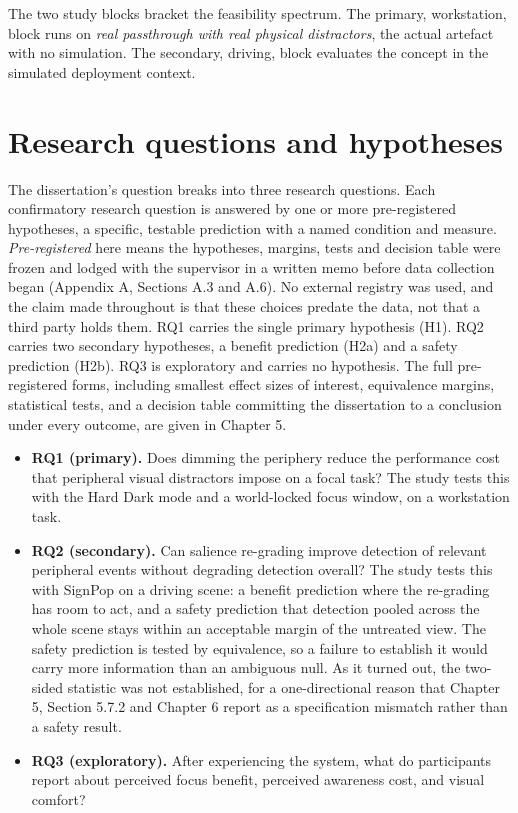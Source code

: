 The two study blocks bracket the feasibility spectrum. The primary, workstation, block runs on
\textit{real passthrough with real physical distractors}, the actual artefact with no simulation. The
secondary, driving, block evaluates the concept in the simulated deployment context.

\section{Research questions and hypotheses}

The dissertation's question breaks into three research questions. Each confirmatory research
question is answered by one or more pre-registered hypotheses, a specific, testable prediction with
a named condition and measure. \textit{Pre-registered} here means the hypotheses, margins, tests and
decision table were frozen and lodged with the supervisor in a written memo before data collection
began (Appendix A, Sections A.3 and A.6). No external registry was used, and the claim made throughout is that
these choices predate the data, not that a third party holds them. RQ1 carries the single primary
hypothesis (H1). RQ2 carries two
secondary hypotheses, a benefit prediction (H2a) and a safety prediction (H2b). RQ3 is exploratory
and carries no hypothesis. The full pre-registered forms, including smallest effect sizes of
interest, equivalence margins, statistical tests, and a decision table committing the dissertation
to a conclusion under every outcome, are given in Chapter 5.

\begin{itemize}
\item \textbf{RQ1 (primary).} Does dimming the periphery reduce the performance cost that peripheral
  visual distractors impose on a focal task? The study tests this with the Hard Dark mode and a
  world-locked focus window, on a workstation task.
\item \textbf{RQ2 (secondary).} Can salience re-grading improve detection of relevant peripheral
  events without degrading detection overall? The study tests this with SignPop on a driving scene:
  a benefit prediction where the re-grading has room to act, and a safety prediction that detection
  pooled across the whole scene stays within an acceptable margin of the untreated view. The safety
  prediction is tested by equivalence, so a failure to establish it would carry more information than
  an ambiguous null. As it turned out, the two-sided statistic was not established, for a
  one-directional reason that Chapter 5, Section 5.7.2 and Chapter 6 report as a specification
  mismatch rather than a safety result.
\item \textbf{RQ3 (exploratory).} After experiencing the system, what do participants report about
  perceived focus benefit, perceived awareness cost, and visual comfort?
\end{itemize}

